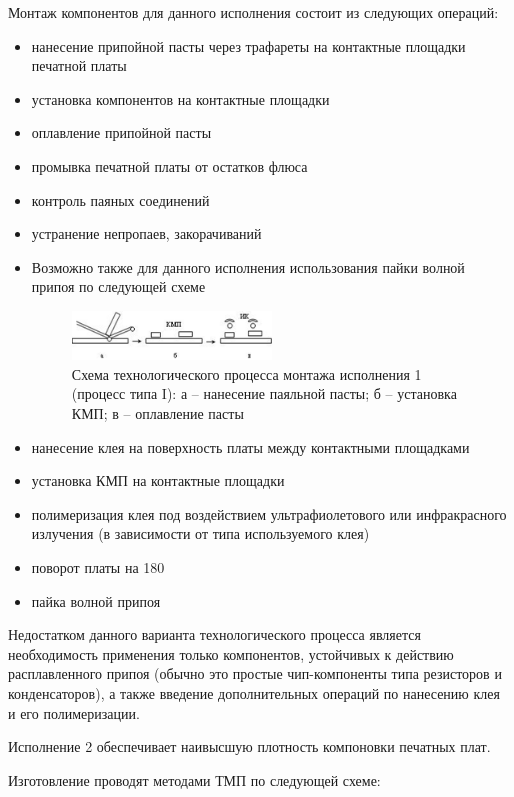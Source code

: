 \documentclass[unicode, 12pt, a4paper, oneside]{article}
\begin{document}
Монтаж компонентов для данного исполнения состоит из следующих операций:

\begin{itemize}
\item нанесение припойной пасты через трафареты на контактные площадки печатной платы
\item установка компонентов на контактные площадки
\item оплавление припойной пасты
\item промывка печатной платы от остатков флюса
\item контроль паяных соединений
\item устранение непропаев,  закорачиваний
\item Возможно также для данного исполнения использования пайки волной припоя по следующей схеме
\begin{figure}[htbp]
\centering
\includegraphics[width=0.5\textwidth]{85_scheme.png}
\caption{Схема технологического процесса монтажа исполнения 1 (процесс типа I): а – нанесение паяльной пасты;  б – установка КМП;  в – оплавление пасты}
\label{fig:85_scheme}
\end{figure}
\item нанесение клея на поверхность платы между контактными площадками
\item установка КМП на контактные площадки
\item полимеризация клея под воздействием ультрафиолетового или инфракрасного излучения (в зависимости от типа используемого клея)
\item поворот платы на 180 \textcelsius
\item пайка волной припоя
\end{itemize}

Недостатком данного варианта технологического процесса является необходимость применения только компонентов, устойчивых к действию расплавленного припоя   (обычно это простые чип-компоненты типа резисторов и конденсаторов), а также введение дополнительных операций по нанесению клея и его полимеризации.

Исполнение 2 обеспечивает  наивысшую плотность компоновки печатных плат.

Изготовление проводят методами ТМП по следующей схеме:
\end{document}
